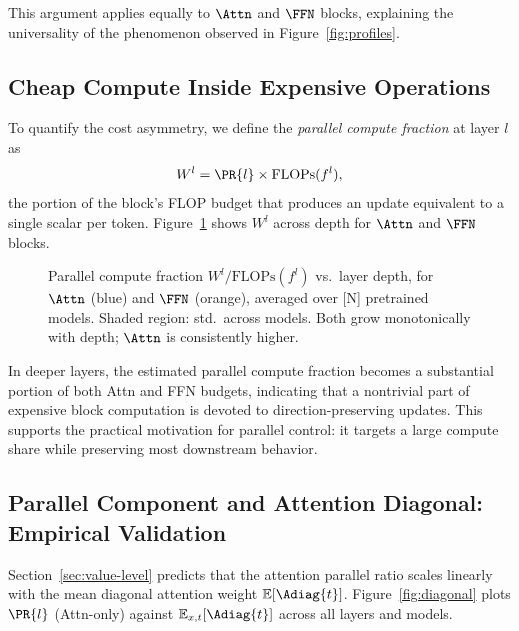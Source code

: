 This argument applies equally to $\Attn$ and $\FFN$ blocks, explaining the
universality of the phenomenon observed in Figure~\ref{fig:profiles}.

\subsection{Cheap Compute Inside Expensive Operations}
\label{sec:waste}

To quantify the cost asymmetry, we define the \emph{parallel compute
fraction} at layer $l$ as
\begin{equation}
  W^l = \PR{l} \times \mathrm{FLOPs}(f^l),
\end{equation}
the portion of the block's FLOP budget that produces an update equivalent
to a single scalar per token.  Figure~\ref{fig:waste} shows $W^l$ across
depth for $\Attn$ and $\FFN$ blocks.

\begin{figure}[t]
  \centering
  \fbox{\rule{0pt}{4.5cm}\rule{0.85\linewidth}{0pt}}
  \caption{Parallel compute fraction $W^l / \mathrm{FLOPs}(f^l)$ vs.\ layer
           depth, for $\Attn$ (blue) and $\FFN$ (orange), averaged over [N]
           pretrained models.  Shaded region: std.\ across models.
           Both grow monotonically with depth; $\Attn$ is consistently higher.}
  \label{fig:waste}
\end{figure}

In deeper layers, the estimated parallel compute fraction becomes a substantial
portion of both Attn and FFN budgets, indicating that a nontrivial part of
expensive block computation is devoted to direction-preserving updates.  This
supports the practical motivation for parallel control: it targets a large
compute share while preserving most downstream behavior.

\subsection{Parallel Component and Attention Diagonal: Empirical Validation}
\label{sec:diagonal-validation}

Section~\ref{sec:value-level} predicts that the attention parallel ratio scales
linearly with the mean diagonal attention weight $\mathbb{E}[\Adiag{t}]$.
Figure~\ref{fig:diagonal} plots $\PR{l}$ (Attn-only) against
$\mathbb{E}_{x,t}[\Adiag{t}]$ across all layers and models.

